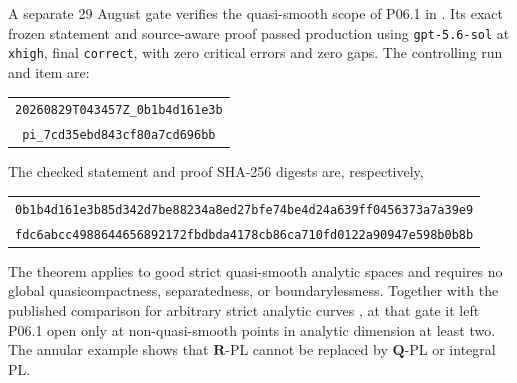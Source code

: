A separate 29 August gate verifies the quasi-smooth scope of P06.1 in
.  Its exact frozen statement and
source-aware proof passed production using \texttt{gpt-5.6-sol} at
\texttt{xhigh}, final \texttt{correct}, with zero critical errors and zero
gaps.  The controlling run and item are:
\begin{center}
\small
\begin{tabular}{@{}c@{}}
\nolinkurl{20260829T043457Z_0b1b4d161e3b}\\
\nolinkurl{pi_7cd35ebd843cf80a7cd696bb}
\end{tabular}
\end{center}
The checked statement and proof SHA-256 digests are, respectively,
\begin{center}
\small
\begin{tabular}{@{}c@{}}
\nolinkurl{0b1b4d161e3b85d342d7be88234a8ed27bfe74be4d24a639ff0456373a7a39e9}\\
\nolinkurl{fdc6abcc4988644656892172fbdbda4178cb86ca710fd0122a90947e598b0b8b}
\end{tabular}
\end{center}
The theorem applies to good strict quasi-smooth analytic spaces and requires
no global quasicompactness, separatedness, or boundarylessness.  Together
with the published comparison for arbitrary strict analytic curves
\cite[\S4.1.2 and Proposition~3.15]{GR25Classical}, at that gate it left
P06.1 open only at non-quasi-smooth points in analytic dimension at least two.
The annular example  shows that
\(\mathbf R\)-PL cannot be replaced by \(\mathbf Q\)-PL or integral PL.


